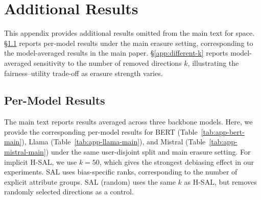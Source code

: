 \documentclass[11pt]{article}
\begin{document}
\section{Additional Results}

\label{app:additional_results}

This appendix provides additional results omitted from the main text for space.
\S\ref{app:eachmodel} reports per-model results under the main erasure setting, corresponding to the model-averaged results in the main paper.
\S\ref{app:different-k} reports model-averaged sensitivity to the number of removed directions \(k\), illustrating the fairness--utility trade-off as erasure strength varies.

\subsection{Per-Model Results}
\label{app:eachmodel}

The main text reports results averaged across three backbone models. Here, we provide the corresponding per-model results for BERT (Table~\ref{tab:app-bert-main}), Llama (Table~\ref{tab:app-llama-main}), and Mistral (Table~\ref{tab:app-mistral-main}) under the same user-disjoint split and main erasure setting. For implicit H-\textsc{SAL}, we use \(k=50\), which gives the strongest debiasing effect in our experiments. \textsc{SAL} uses bias-specific ranks, corresponding to the number of explicit attribute groups. \textsc{SAL} (random) uses the same \(k\) as H-\textsc{SAL}, but removes randomly selected directions as a control.
\end{document}
